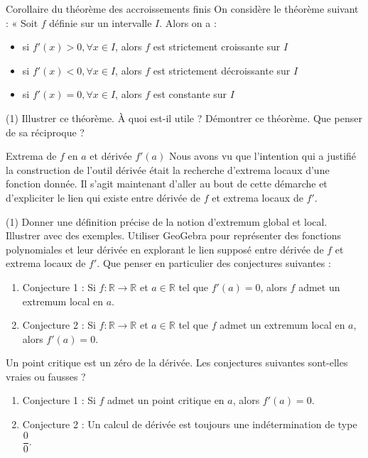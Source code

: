 \documentclass[a4paper,12pt]{article}
\begin{document}
\begin{activite}{Corollaire du théorème des accroissements finis}
\tcblower
On considère le théorème suivant : « Soit $f$ définie sur un intervalle $I$. Alors on a :
\begin{itemize}
	\item si $f'(x) > 0, \forall x \in I$, alors $f$ est strictement croissante sur $I$
\item si $f'(x) < 0, \forall x \in I$, alors $f$ est strictement décroissante sur $I$
\item si $f'(x) = 0, \forall x \in I$, alors $f$ est constante sur $I$
\end{itemize}
\begin{tasks}(1)
\task Illustrer ce théorème.
\task À quoi est-il utile ?
\task Démontrer ce théorème.
\task Que penser de sa réciproque ?
\end{tasks}
\end{activite}


\begin{activite}{Extrema de \(f\) en \(a\) et dérivée \(f'(a)\)}
\tcblower
Nous avons vu que l’intention qui a justifié la construction de l’outil dérivée était la recherche d’extrema locaux d’une fonction donnée. Il s’agit maintenant d’aller au bout de cette démarche et d’expliciter le lien qui existe entre dérivée de \(f\) et extrema locaux de \(f'\).

\begin{tasks}(1)
  \task Donner une définition précise de la notion d’extremum global et local. Illustrer avec des exemples.
  \task Utiliser GeoGebra pour représenter des fonctions polynomiales et leur dérivée en explorant le lien supposé entre dérivée de \(f\) et extrema locaux de \(f'\).
  \task Que penser en particulier des conjectures suivantes :
    \begin{enumerate}
      \item Conjecture 1 : Si \(f : \mathbb{R}\to\mathbb{R}\) et \(a\in\mathbb{R}\) tel que \(f'(a)=0\), alors \(f\) admet un extremum local en \(a\).
      \item Conjecture 2 : Si \(f : \mathbb{R}\to\mathbb{R}\) et \(a\in\mathbb{R}\) tel que \(f\) admet un extremum local en \(a\), alors \(f'(a)=0\).
    \end{enumerate}
  \task Un point critique est un zéro de la dérivée. Les conjectures suivantes sont-elles vraies ou fausses ?
    \begin{enumerate}
      \item Conjecture 1 : Si \(f\) admet un point critique en \(a\), alors \(f'(a)=0\).
      \item Conjecture 2 : Un calcul de dérivée est toujours une indétermination de type \(\dfrac{0}{0}\).
    \end{enumerate}
\end{tasks}
\end{activite}
\end{document}
